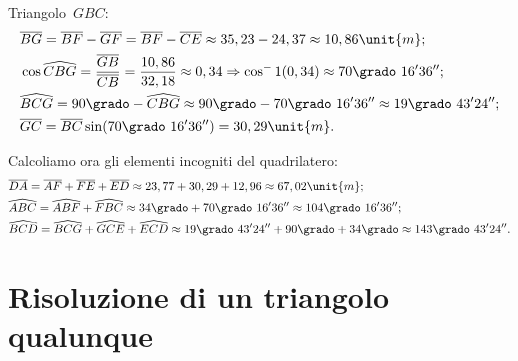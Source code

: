 \begin{esempio}
Triangolo~\(GBC\):
\begin{align*}
&\overline{BG}=\overline{BF}-\overline{GF}=\overline{BF}-\overline{CE}
\approx35,
23-24,37\approx10,86\unit{m};\\
&\cos \widehat{CBG}=\frac{\overline{GB}}{\overline{CB}}=\frac{10,86}{32,18}
\approx0,34\Rightarrow\cos^-1(0,34)\approx70\grado~16' 36'';\\
&\widehat{BCG}=90\grado-\widehat{CBG}\approx90\grado-70\grado~16' 
36''\approx19\grado~43' 24'';\\
&\overline{GC}=\overline{BC}\sin (70\grado~16' 36'')=30,29\unit{m}.
\end{align*}

Calcoliamo ora gli elementi incogniti del quadrilatero:
\begin{align*}
&\overline{DA}=\overline{AF}+\overline{FE}+\overline{ED}\approx23,77+30,29+12,
96\approx67,02\unit{m};\\
&\widehat{ABC}=\widehat{ABF}+\widehat{FBC}\approx34\grado+70\grado~16' 
36''\approx104\grado~16' 36'';\\
&\widehat{BCD}= \widehat{BCG}+\widehat{GCE}+\widehat{ECD}\approx19\grado~43' 
24''+90\grado+34\grado\approx143\grado~43' 24''.
\end{align*}
\end{esempio}

% 

\section{Risoluzione di un triangolo qualunque}
\label{sec:trigo_triangoloqualunque}

